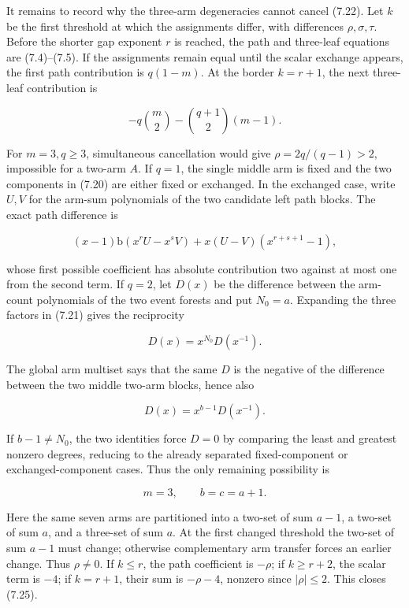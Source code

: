 \documentclass[11pt]{article}
\renewcommand{\mathsf}[1]{\mathrm{#1}}
\begin{document}
It remains to record why the three-arm degeneracies cannot cancel (7.22). Let $k$ be the first
threshold at which the assignments differ, with differences $\rho,\sigma,\tau$. Before the shorter
gap exponent $r$ is reached, the path and three-leaf equations are (7.4)--(7.5). If the assignments
remain equal until the scalar exchange appears, the first path contribution is $q(1-m)$. At the
border $k=r+1$, the next three-leaf contribution is

\begin{equation*}
-q\binom m2-\binom{q+1}2(m-1).
\tag{7.23}
\end{equation*}


For $m=3,q\geq3$, simultaneous cancellation would give
$\rho=2q/(q-1)>2$, impossible for a two-arm $A$. If $q=1$, the single middle arm is fixed and the
two components in (7.20) are either fixed or exchanged. In the exchanged case, write $U,V$ for
the arm-sum polynomials of the two candidate left path blocks. The exact path difference is

\begin{equation*}
(x-1)\mathsf b(x^rU-x^sV)+x(U-V)(x^{r+s+1}-1),
\tag{7.24}
\end{equation*}


whose first possible coefficient has absolute contribution two against at most one from the second
term. If $q=2$, let $D(x)$ be the difference between the arm-count polynomials of the two event
forests and put $N_0=a$. Expanding the three factors in (7.21) gives the reciprocity

\begin{equation*}
D(x)=x^{N_0}D(x^{-1}).
\end{equation*}


The global arm multiset says that the same $D$ is the negative of the difference between the two
middle two-arm blocks, hence also

\begin{equation*}
D(x)=x^{b-1}D(x^{-1}).
\end{equation*}


If $b-1\neq N_0$, the two identities force $D=0$ by comparing the least and greatest nonzero
degrees, reducing to the already separated fixed-component or exchanged-component cases. Thus the
only remaining possibility is

\begin{equation*}
m=3,\qquad b=c=a+1.
\tag{7.25}
\end{equation*}


Here the same seven arms are partitioned into a two-set of sum $a-1$, a two-set of sum $a$, and a
three-set of sum $a$. At the first changed threshold the two-set of sum $a-1$ must change; otherwise
complementary arm transfer forces an earlier change. Thus $\rho\neq0$. If $k\leq r$, the path
coefficient is $-\rho$; if $k\geq r+2$, the scalar term is $-4$; if $k=r+1$, their sum is
$-\rho-4$, nonzero since $|\rho|\leq2$. This closes (7.25).
\end{document}

